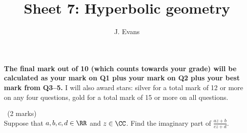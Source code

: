 \documentclass[12pt]{article}
\title{Sheet 7: Hyperbolic geometry}
\author{J. Evans}
\date{}
\begin{document}
\maketitle

\bigskip

{\bf The final mark out of 10 (which counts towards your grade) will be calculated as your mark on Q1 plus your mark on Q2 plus your best mark from Q3--5.} I will also award stars: silver for a total mark of 12 or more on any four questions, gold for a total mark of 15 or more on all questions.

\vspace{1cm}

\begin{question}\ (2 marks)\\
  Suppose that $a,b,c,d\in\RR$ and $z\in\CC$. Find the imaginary part of $\frac{az+b}{cz+d}$.
\end{question}

\iffalse
\begin{answer}
  We have
  \[\frac{az+b}{cz+d}=\frac{(az+b)(c\bar{z}+d)}{|cz+d|^2}=\frac{ac|z|^2+bd+bc\bar{z}+adz}{|cz+d|^2}.\]
  The denominator is real and the imaginary part of the numerator $ac|z|^2+bd+bc\bar{z}+adz$ is $(ad-bc)\OP{Im}(z)$, so the imaginary part of $(az+b)/(cz+d)$ is
  \[\frac{(ad-bc)\OP{Im}(z)}{|cz+d|^2}.\]
\end{answer}
\newpage
\fi

\vspace{1cm}
\end{document}
